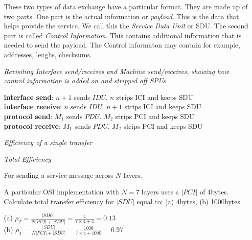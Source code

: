 These two types of data exchange have a particular format. 
They are made up of two parts. 
One part is the actual information or \textit{payload}. This is 
the data that helps provide the service. 
We call this the \textit{Service Data Unit} or SDU.
The second part is called \textit{Control Information}. This contains 
additional information that is needed to send the payload. The Control 
informaton may contain for example, addresses, lenghs, checksums. 





\frmrule 

\textit{Revisiting Interface send/receives and Machine send/receives, 
showing how control information is added on and stripped off SPUs}


\textbf{interface send}: $n+1$ sends $IDU$. $n$ strips ICI and keeps SDU \\
\textbf{interface receive}: $n$ sends $IDU$. $n+1$ strips ICI and keeps SDU\\
\textbf{protocol send}: $M_1$ sends $PDU$. $M_2$ strips PCI and keeps SDU \\
\textbf{protocol receive}: $M_1$ sends $PDU$. $M_2$ strips PCI and keeps SDU \\




\frmrule 

\textit{Efficiency of a single transfer}




\frmrule 





\textit{Total Efficiency}


For sending a service message across $N$ layers. 

\frmrule

\begin{example}
A particular OSI implementation with $N=7$ layers uses a $|PCI|$ of 4bytes. \\
Calculate total transfer efficiency for $|SDU|$ equal to:
(a) 4bytes, (b) 1000bytes.

(a) $\rho_T = \frac{|SDU|}{N|PCI|+|SDU|} = \frac{4}{7 \times 4 + 4} = 0.13$ \\
(b) $\rho_T = \frac{|SDU|}{N|PCI|+|SDU|} = \frac{1000}{7 \times 4 + 1000} = 0.97$ \\

\end{example}

